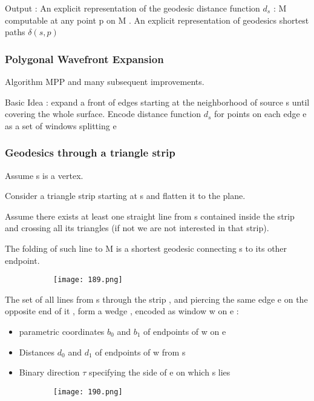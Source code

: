 \documentclass{article}
\begin{document}
Output : An explicit representation of the geodesic distance function $d_s$ : M  computable at any point p on M . An explicit representation of geodesics shortest paths $\delta(s,p)$

\subsubsection{Polygonal Wavefront Expansion}

Algorithm MPP and many subsequent improvements.

Basic Idea : expand a front of edges starting at the neighborhood of source s until covering the whole surface. Encode distance function $d_s$ for points on each edge e as a set of windows splitting e

\subsubsection{Geodesics through a triangle strip}

Assume s is a vertex.

Consider a triangle strip starting at s and flatten it to the plane.

Assume there exists at least one straight line from s contained inside the strip and crossing all its triangles (if not we are not interested in that strip).

The folding of such line to M is a shortest geodesic connecting s to its other endpoint.

  \begin{figure}[ht!]
  \centering
  \begin{subfigure}[b]{0.5\linewidth}
    \texttt{[image: 189.png]}
  \end{subfigure}
\end{figure}

The set of all lines from s through the strip , and piercing the same edge e on the opposite end of it , form a wedge , encoded as window w on e :

\begin{itemize}
    \item parametric coordinates $b_0$ and $b_1$ of endpoints of w on e
    \item Distances $d_0$ and $d_1$ of endpoints of w from s
    \item Binary direction $\tau$ specifying the side of e on which s lies
\end{itemize}

  \begin{figure}[ht!]
  \centering
  \begin{subfigure}[b]{0.5\linewidth}
    \texttt{[image: 190.png]}
  \end{subfigure}
\end{figure}
\end{document}
